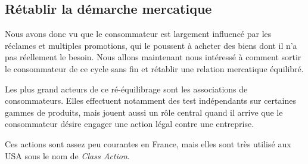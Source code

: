 \subsection{Rétablir la démarche mercatique}
\medbreak
Nous avons donc vu que le consommateur est largement influencé par les réclames et multiples promotions, qui le poussent à acheter des biens dont il n'a pas réellement le besoin. Nous allons maintenant nous intéressé à comment sortir le consommateur de ce cycle sans fin et rétablir une relation mercatique équilibré.

\smallbreak
Les plus grand acteurs de ce ré-équilibrage sont les associations de consommateurs. %
Elles effectuent notamment des test indépendants sur certaines gammes de produits, mais jouent aussi un rôle central quand il arrive que le consommateur désire engager une action légal contre une entreprise.

Ces actions sont assez peu courantes en France, mais elles sont très utilisé aux USA sous le nom de \textit{Class Action}.